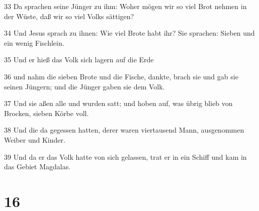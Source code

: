 \par 33 Da sprachen seine Jünger zu ihm: Woher mögen wir so viel Brot nehmen in der Wüste, daß wir so viel Volks sättigen?
\par 34 Und Jesus sprach zu ihnen: Wie viel Brote habt ihr? Sie sprachen: Sieben und ein wenig Fischlein.
\par 35 Und er hieß das Volk sich lagern auf die Erde
\par 36 und nahm die sieben Brote und die Fische, dankte, brach sie und gab sie seinen Jüngern; und die Jünger gaben sie dem Volk.
\par 37 Und sie aßen alle und wurden satt; und hoben auf, was übrig blieb von Brocken, sieben Körbe voll.
\par 38 Und die da gegessen hatten, derer waren viertausend Mann, ausgenommen Weiber und Kinder.
\par 39 Und da er das Volk hatte von sich gelassen, trat er in ein Schiff und kam in das Gebiet Magdalas.

\chapter{16}

